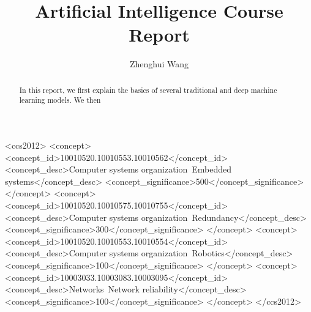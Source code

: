 \documentclass[sigconf]{acmart}
\begin{document}
	\title{Artificial Intelligence Course Report}
	
	
	\author{Zhenghui Wang}
	

	
	\renewcommand{\shortauthors}{Zhenghui Wang}
	
	
	\begin{abstract}
		In this report, we first explain the basics of several traditional and deep machine learning models. We then  
	
	\end{abstract}
	
	\begin{CCSXML}
		<ccs2012>
		<concept>
		<concept_id>10010520.10010553.10010562</concept_id>
		<concept_desc>Computer systems organization~Embedded systems</concept_desc>
		<concept_significance>500</concept_significance>
		</concept>
		<concept>
		<concept_id>10010520.10010575.10010755</concept_id>
		<concept_desc>Computer systems organization~Redundancy</concept_desc>
		<concept_significance>300</concept_significance>
		</concept>
		<concept>
		<concept_id>10010520.10010553.10010554</concept_id>
		<concept_desc>Computer systems organization~Robotics</concept_desc>
		<concept_significance>100</concept_significance>
		</concept>
		<concept>
		<concept_id>10003033.10003083.10003095</concept_id>
		<concept_desc>Networks~Network reliability</concept_desc>
		<concept_significance>100</concept_significance>
		</concept>
		</ccs2012>  
	\end{CCSXML}
	
	
	
	
	
	\maketitle
	
\end{document}
